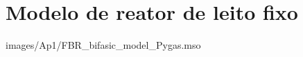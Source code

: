 %
%
%
\chapter{Modelo de reator de leito fixo}
\label{chap:modeloleitofixo}

 {images/Ap1/FBR_bifasic_model_Pygas.mso}

